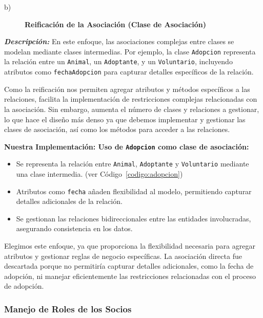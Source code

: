 \begin{description}
    \item[b)] \textbf{Reificación de la Asociación (Clase de Asociación)}
\end{description}

\textit{\textbf{Descripción:}}  
En este enfoque, las asociaciones complejas entre clases se modelan mediante clases 
intermedias. Por ejemplo, la clase \texttt{Adopcion} representa la relación entre un 
\texttt{Animal}, un \texttt{Adoptante}, y un \texttt{Voluntario}, incluyendo atributos 
como \texttt{fechaAdopcion} para capturar detalles específicos de la relación.\par
\vspace{0.15cm}
Como la reificación nos permiten agregar atributos y métodos específicos a las relaciones,
facilita la implementación de restricciones complejas relacionadas con la asociación.
Sin embargo, aumenta el número de clases y relaciones a gestionar, lo que hace el diseño más denso
ya que debemos implementar y gestionar las clases de asociación, así como los métodos para 
acceder a las relaciones.\par
\vspace{0.15cm}

\textbf{Nuestra Implementación: Uso de \texttt{Adopcion} como clase de asociación:}
\begin{itemize}
    \item Se representa la relación entre \texttt{Animal}, \texttt{Adoptante} y 
    \texttt{Voluntario} mediante una clase intermedia. (ver Código~\ref{codigo:adopcion})
    \item Atributos como \texttt{fecha} añaden flexibilidad al modelo, permitiendo 
    capturar detalles adicionales de la relación.
    \item Se gestionan las relaciones bidireccionales entre las entidades involucradas, 
    asegurando consistencia en los datos.
\end{itemize}

Elegimos este enfoque, ya que proporciona la flexibilidad necesaria para agregar atributos 
y gestionar reglas de negocio específicas. La asociación directa fue descartada porque no 
permitiría capturar detalles adicionales, como la fecha de adopción, ni manejar eficientemente 
las restricciones relacionadas con el proceso de adopción.



\subsubsection{Manejo de Roles de los Socios}

